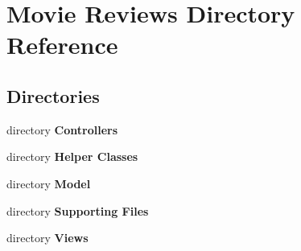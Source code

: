 \section{Movie Reviews Directory Reference}
\label{dir_577ac98355290653da4acb3a661ea61c}
\subsection*{Directories}
\begin{DoxyCompactItemize}
\item 
directory {\bf Controllers}
\item 
directory {\bf Helper Classes}
\item 
directory {\bf Model}
\item 
directory {\bf Supporting Files}
\item 
directory {\bf Views}
\end{DoxyCompactItemize}
